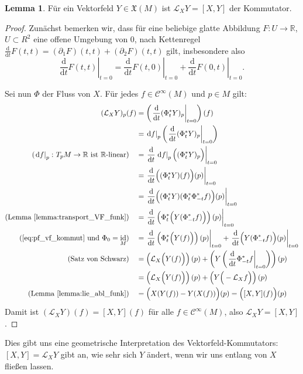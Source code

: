 \documentclass[a4paper]{scrreprt}
\numberwithin{equation}{chapter}
\newcommand{\D}{\mathrm{d}}
\DeclareMathOperator{\id}{id}
\newcommand{\sC}{\mathcal{C}^{\infty}}
\theoremstyle{definition}
\newtheorem{lemma}[defn]{Lemma}
\begin{document}
\begin{lemma}
	Für ein Vektorfeld $Y \in \mathfrak X(M)$ ist $\mathcal L_X Y = [X,Y]$ der Kommutator.

	\begin{proof}
		Zunächst bemerken wir, dass für eine beliebige glatte Abbildung $F \colon U \to \mathbb R$, $U \subset R^2$ eine offene Umgebung von 0, nach Kettenregel $\frac{\D}{\D t} F(t,t) = (\partial_1 F)(t,t) + (\partial_2 F)(t,t)$ gilt, insbesondere also
		\begin{equation} \label{eq:pf_vf_kommut} \tag{$*$}
			\left.\frac{\D}{\D t} F(t,t)\right|_{t=0} = \left.\frac{\D}{\D t} F(t,0)\right|_{t=0} + \left.\frac{\D}{\D t} F(0,t)\right|_{t=0}.
		\end{equation}

		Sei nun $\Phi$ der Fluss von $X$. Für jedes $f\in \sC(M)$ und $p\in M$ gilt:
		\begingroup
		\allowdisplaybreaks
		\begin{align*}
			(\mathcal L_X Y)_p(f) &= \left(\left.\frac{\D}{\D t}(\Phi_t^* Y)_p\right|_{t=0}\right)(f)\\
			&= \left.\D f\right|_p \left(\left.\frac{\D}{\D t}(\Phi_t^* Y)_p\right|_{t=0}\right)\\
			\text{($\left.\D f\right|_p\colon T_pM \to \mathbb R$ ist $\mathbb R$-linear)} \quad &= \left.\frac{\D}{\D t}\left.\D f\right|_p \Big((\Phi_t^* Y)_p\Big)\right|_{t=0}\\
			&= \left.\frac{\D}{\D t} \Big((\Phi_t^* Y) (f)\Big)(p)\right|_{t=0}\\
			&= \left.\frac{\D}{\D t}\Big((\Phi_t^* Y)(\Phi_t^* \Phi_{-t}^*f)\Big)(p)\right|_{t=0}\\
			\text{(Lemma \ref{lemma:transport_VF_funk})} \quad &= \left.\frac{\D}{\D t} \left(\Phi_t^* \Big(Y(\Phi_{-t}^*f)\Big)\right)(p) \right|_{t=0}\\
			\text{(\eqref{eq:pf_vf_kommut} und $\Phi_0 = \id_M$)} \quad &= \left.\frac{\D}{\D t}\left(\Phi_t^* \Big(Y(f)\Big)\right) (p) \right|_{t=0} + \left.\frac{\D}{\D t} \Big(Y(\Phi_{-t}^*f)\Big) (p) \right|_{t=0}\\
			\text{(Satz von Schwarz)} \quad &= \left(\mathcal L_X \Big(Y(f)\Big)\right)(p) + \left(Y\left( \left.\frac{\D}{\D t} \Phi_{-t}^*f \right|_{t=0} \right)\right)(p)\\
			&= \left(\mathcal L_X \Big(Y(f)\Big)\right)(p) + \left(Y\Big( - \mathcal L_X f \Big)\right)(p)\\
			\text{(Lemma \ref{lemma:lie_abl_funk})} \quad &= \Big(X(Y(f)) - Y(X(f))\Big)(p) = \Big([X,Y](f)\Big)(p)
		\end{align*}%
		\endgroup
		Damit ist $(\mathcal L_X Y)(f) = [X,Y](f)$ für alle $f\in\sC(M)$, also $\mathcal L_X Y = [X,Y]$.
	\end{proof}
\end{lemma}
Dies gibt uns eine geometrische Interpretation des Vektorfeld-Kommutators: $[X,Y] = \mathcal L_X Y$ gibt an, wie sehr sich $Y$ ändert, wenn wir uns entlang von $X$ fließen lassen.
\end{document}
